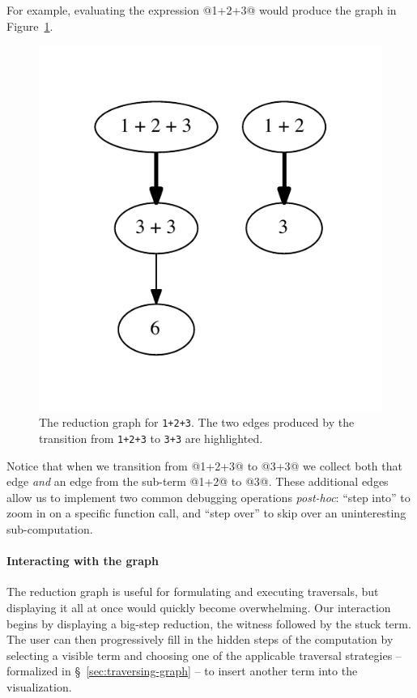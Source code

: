 For example, evaluating the expression @1+2+3@ would produce the
graph in Figure~\ref{fig:simple-reduction-hi}.
%
\begin{figure}[t]
  \centering
  \includegraphics[width=\linewidth]{simple.pdf}
  \caption{The reduction graph for \texttt{1+2+3}. The two edges
    produced by the transition from \texttt{1+2+3} to \hbox{\texttt{3+3}}
    are highlighted.}
\label{fig:simple-reduction-hi}
\end{figure}
%
Notice that when we transition from @1+2+3@ to @3+3@ we collect
both that edge \emph{and} an edge from the sub-term @1+2@ to @3@.
%
These additional edges allow us to implement two common debugging
operations \emph{post-hoc}: ``step into'' to zoom in on a specific
function call, and ``step over'' to skip over an uninteresting
sub-computation.

\paragraph{Interacting with the graph}
The reduction graph is useful for formulating and executing traversals,
but displaying it all at once would quickly become overwhelming.
%
Our interaction begins by displaying a big-step reduction, \ie the
witness followed by the stuck term.
%
The user can then progressively fill in the hidden steps of the
computation by selecting a visible term and choosing one of the
applicable traversal strategies -- formalized in
\S~\ref{sec:traversing-graph} -- to insert another term into the
visualization.

